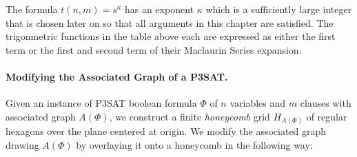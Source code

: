 \documentclass[10pt]{CSUNthesis}
\theoremstyle{plain}%
\theoremstyle{definition}
\theoremstyle{remark}
\newcommand{\lr}[1]{\left( #1 \right)}
\begin{document}
The formula $t(n,m)=s^\kappa$ has an exponent $\kappa$ which is a sufficiently large integer that is chosen later on so that all arguments in this chapter are satisfied.
The trigonmetric functions in the table above each are expressed as either the first term or the first and second term of their Maclaurin Series expansion.

\paragraph{Modifying the Associated Graph of a P3SAT.}

Given an instance of P3SAT boolean formula $\Phi$ of $n$ variables and $m$ clauses with associated graph $A(\Phi)$, we construct a finite \textit{honeycomb} grid $H_{A \lr{\Phi}}$ of regular hexagons over the plane centered at origin.
We modify the associated graph drawing $A\lr{\Phi}$ by overlaying it onto a honeycomb in the following way:
\end{document}
